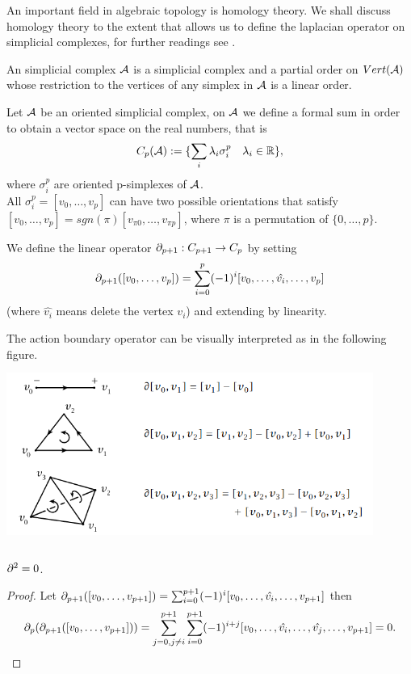 \documentclass[../1.tex]{subfiles}
\begin{document}
    An important field in algebraic topology is homology theory. We shall discuss homology theory to the extent
    that allows us to define the laplacian operator on simplicial complexes, for further readings see \cite{hatcher}.
    \begin{defn}
        An  simplicial complex $\mathcal{A}$ is a simplicial complex and a partial order on $Vert(\mathcal{A})$ whose
        restriction to the vertices of any simplex in $\mathcal{A}$ is a linear order.
    \end{defn}

    \begin{defn}
        Let $\mathcal{A}$ be an oriented simplicial complex, on $\mathcal{A}$ we define a formal sum in order
        to obtain a vector space on the real numbers, that is
        \[ C_p(\mathcal{A}) := \{ \sum_i \lambda_i \sigma_i^p \quad \lambda_i \in \mathbb{R} \},\]
        where $\sigma_i^p$ are oriented p-simplexes of $\mathcal{A}$.\\
        All $\sigma_i^p = [v_0,\dots,v_p]$ can have two possible orientations that satisfy
        $ [v_0,\dots,v_p] = sgn (\pi)[v_{\pi 0},\dots,v_{\pi p}]$,
        where $\pi$ is a permutation of $\{0,\dots,p\}$.        
    \end{defn}

    \begin{defn}
        We define the linear operator $\partial_{p+1} : C_{p+1} \to C_p$ by setting
        \[ \partial_{p+1}([v_0,\dots,v_p]) = \sum_{i=0}^p (-1)^i[v_0,\dots,\hat{v_i},\dots,v_p] \]
        (where $\hat{v_i}$ means delete the vertex $v_i$) and extending by linearity.
    \end{defn}

    The action boundary operator can be visually interpreted as in the following figure.\\
    \includegraphics[width = 12cm, height = 6cm]{sections/1/boundary}

    \begin{thm}
        $\partial^2 = 0$.
    \end{thm}
    \begin{proof}
        Let $\partial_{p+1}([v_0,\dots,v_{p+1}]) = \sum_{i=0}^{p+1} (-1)^i[v_0,\dots,\hat{v_i},\dots,v_{p+1}]$ then 
        \[\partial_p(\partial_{p+1}([v_0,\dots,v_{p+1}])) =\sum_{j=0, j \neq i}^{p+1} \sum_{i=0}^{p+1} (-1)^{i+j}[v_0,\dots,\hat{v_i},\dots,\hat{v_j},\dots,v_{p+1}] = 0.\]        
    \end{proof}
\end{document}

